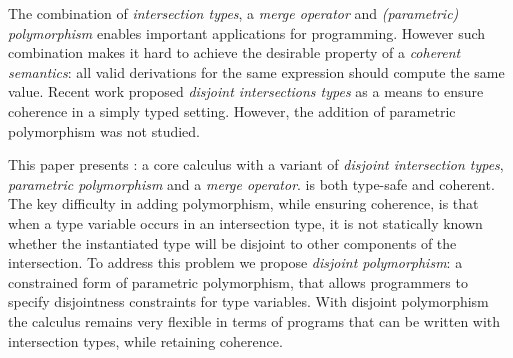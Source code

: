 The combination of \emph{intersection types}, a \emph{merge operator} 
and \emph{(parametric) polymorphism} enables
important applications for programming. However such combination makes
it hard to achieve the desirable property of a \emph{coherent
semantics}: all valid derivations for the same expression should
compute the same value. Recent work proposed \emph{disjoint
intersections types} as a means to ensure coherence in a simply typed
setting. However, the addition of parametric polymorphism was not
studied.

This paper presents \name: a core calculus with a variant of
\emph{disjoint intersection types}, \emph{parametric polymorphism} and a
\emph{merge operator}. \name is both type-safe and
coherent. The key difficulty in adding polymorphism, while ensuring
coherence, is that when a type variable occurs in an intersection
type, it is not statically known whether the instantiated type will be
disjoint to other components of the intersection. To address this
problem we propose \emph{disjoint polymorphism}: a constrained form of
parametric polymorphism, that allows programmers to specify
disjointness constraints for type variables. With disjoint
polymorphism the calculus remains very flexible in terms of programs
that can be written with intersection types, while retaining
coherence.

\begin{comment}
Coherence is achieved by ensuring that intersection types
are \emph{disjoint}. The approach works in the presence of parametric
polymorphism. However, parametric polymorphism makes the problem of coherence
significantly harder. When a type variable occurs in an intersection
type, it is not statically known whether the instantiated type will
be disjoint to other components of the intersection.
To address this problem we propose \emph{disjoint polymorphism}: a
constrained form of parametric polymorphism, that allows programmers
to specify disjointness constraints for type variables. With disjoint
polymorphism the calculus remains very flexible in terms of programs
that can be written with intersection types, while retaining coherence.
\end{comment}